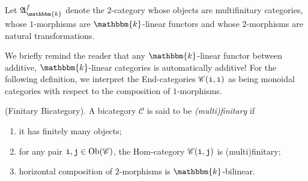 \noindent\begin{definition} Let $\mathfrak{A}_\mathbbm{k}^f$ denote the $2$-category whose objects are multifinitary categories, whose $1$-morphisms are $\mathbbm{k}$-linear functors and whose $2$-morphisms are natural transformations.\\
\end{definition}


\noindent We briefly remind the reader that any $\mathbbm{k}$-linear functor between additive, $\mathbbm{k}$-linear categories is automatically additive! For the following definition, we interpret the End-categories $\mathscr{C}(\textnormal{\texttt{i}}, \textnormal{\texttt{i}})$ as being monoidal categories with respect to the composition of $1$-morphisms.\\

\noindent\begin{definition}\textup{(Finitary Bicategory).} A bicategory $\mathscr{C}$ is said to be {\em (multi)finitary} if
\begin{enumerate}[label=\textup{(\roman*).}, ref=\textup{(\roman*)}, leftmargin=4\parindent]
\item it has finitely many objects;
\item for any pair $\textnormal{\texttt{i}}, \textnormal{\texttt{j}} \in \textnormal{Ob}(\mathscr{C})$, the Hom-category $\mathscr{C}(\textnormal{\texttt{i}}, \textnormal{\texttt{j}})$ is (multi)finitary;
\item horizontal composition of $2$-morphisms is %
$\mathbbm{k}$-bilinear.\\%
\end{enumerate}
\end{definition}

